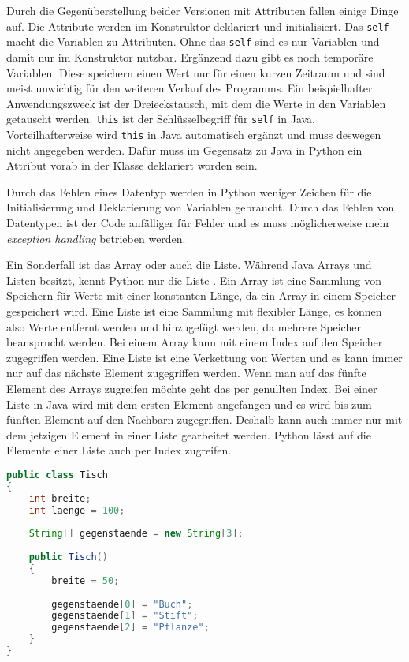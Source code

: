 Durch die Gegenüberstellung beider Versionen mit Attributen fallen einige Dinge auf. Die Attribute werden im Konstruktor deklariert und initialisiert. Das \texttt{self} macht die Variablen zu Attributen. Ohne das \texttt{self} sind es nur Variablen und damit nur im Konstruktor nutzbar. Ergänzend dazu gibt es noch temporäre Variablen. Diese speichern einen Wert nur für einen kurzen Zeitraum und sind meist unwichtig für den weiteren Verlauf des Programms. Ein beispielhafter Anwendungszweck ist der Dreieckstausch, mit dem die Werte in den Variablen getauscht werden. \texttt{this} ist der Schlüsselbegriff für \texttt{self} in Java. Vorteilhafterweise wird \texttt{this} in Java automatisch ergänzt und muss deswegen nicht angegeben werden. Dafür muss im Gegensatz zu Java in Python ein Attribut vorab in der Klasse deklariert worden sein.
\par
Durch das Fehlen eines Datentyp werden in Python weniger Zeichen für die Initialisierung und Deklarierung von Variablen gebraucht. Durch das Fehlen von Datentypen ist der Code anfälliger für Fehler und es muss möglicherweise mehr \textit{exception handling} betrieben werden.
\par
Ein Sonderfall ist das Array oder auch die Liste. Während Java Arrays und Listen besitzt, kennt Python nur die Liste \cite{Louis:2010}\cite{Python3:Buch}. Ein Array ist eine Sammlung von Speichern für Werte mit einer konstanten Länge, da ein Array in einem Speicher gespeichert wird. Eine Liste ist eine Sammlung mit flexibler Länge, es können also Werte entfernt werden und hinzugefügt werden, da mehrere Speicher beansprucht werden. Bei einem Array kann mit einem Index auf den Speicher zugegriffen werden. Eine Liste ist eine Verkettung von Werten und es kann immer nur auf das nächste Element zugegriffen werden. Wenn man auf das fünfte Element des Arrays zugreifen möchte geht das per genullten Index. Bei einer Liste in Java wird mit dem ersten Element angefangen und es wird bis zum fünften Element auf den Nachbarn zugegriffen. Deshalb kann auch immer nur mit dem jetzigen Element in einer Liste gearbeitet werden. Python lässt auf die Elemente einer Liste auch per Index zugreifen. 

\begin{lstlisting}[language=java,caption={Array in Java},captionpos=b,label={lst:java:array},frame=none]
public class Tisch
{
    int breite;
    int laenge = 100;
  
    String[] gegenstaende = new String[3];
  
    public Tisch()
    {
        breite = 50;
    
        gegenstaende[0] = "Buch";
        gegenstaende[1] = "Stift";
        gegenstaende[2] = "Pflanze";
    }
}
\end{lstlisting}

